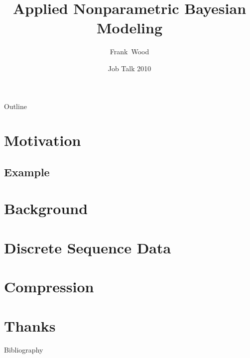 \documentclass{beamer}
\title[Applied Nonparametric Bayesian Modeling] 
{
  Applied Nonparametric Bayesian Modeling
}
\author[Wood]
{
  Frank~Wood%
}
\institute[Columbia University]
{
  Columbia University
}
\date[Job Talk 2010]
{Job Talk 2010}
\begin{document}
\begin{frame}
  \titlepage
\end{frame}

\begin{frame}{Outline}
  \tableofcontents
\end{frame}

\section{Motivation}
\subsection{Example}
\section{Background}

\section{Discrete Sequence Data}
\section{Compression}
\section{Thanks}

\begin{frame}{Bibliography}


\end{frame}
	
\end{document}

